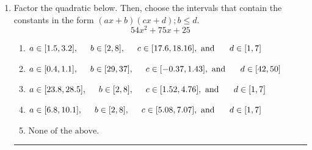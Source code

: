 \documentclass[14pt]{extbook}
\newcommand{\litem}[1]{\item#1\hspace*{-1cm}\rule{\textwidth}{0.4pt}}
\begin{document}
\begin{enumerate}
{\begin{enumerate}[label=\Alph*.]
\end{enumerate} }
\litem{
Factor the quadratic below. Then, choose the intervals that contain the constants in the form $(ax+b)(cx+d); b \leq d.$\[ 54x^{2} +75 x + 25 \]\begin{enumerate}[label=\Alph*.]
\item \( a \in [1.5, 3.2], \hspace*{5mm} b \in [2, 8], \hspace*{5mm} c \in [17.6, 18.16], \text{ and } \hspace*{5mm} d \in [1, 7] \)
\item \( a \in [0.4, 1.1], \hspace*{5mm} b \in [29, 37], \hspace*{5mm} c \in [-0.37, 1.43], \text{ and } \hspace*{5mm} d \in [42, 50] \)
\item \( a \in [23.8, 28.5], \hspace*{5mm} b \in [2, 8], \hspace*{5mm} c \in [1.52, 4.76], \text{ and } \hspace*{5mm} d \in [1, 7] \)
\item \( a \in [6.8, 10.1], \hspace*{5mm} b \in [2, 8], \hspace*{5mm} c \in [5.08, 7.07], \text{ and } \hspace*{5mm} d \in [1, 7] \)
\item \( \text{None of the above.} \)


\end{enumerate}}
\end{enumerate}
\end{document}
